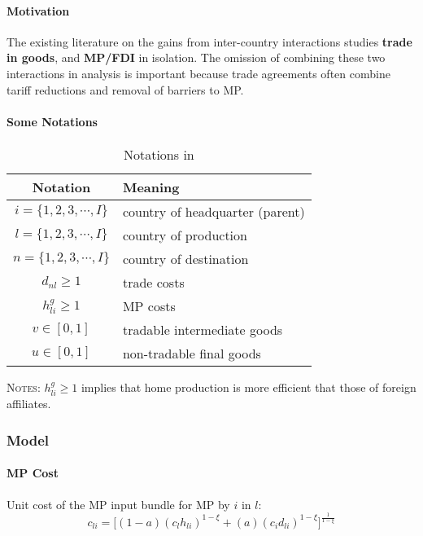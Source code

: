 \paragraph{Motivation}
The existing literature on the gains from inter-country interactions studies 
\textbf{trade in goods}, and \textbf{MP/FDI} in isolation.
The omission of combining these two interactions in analysis is important because 
trade agreements often combine tariff reductions and removal of barriers to MP.

\paragraph{Some Notations}
\begin{table}[h]
    \caption{Notations in \citep{Ramondo:2013}}
        \centering
        \begin{tabular}{c l} \toprule
            Notation & Meaning \\ \hline
            $i = \{1, 2, 3, \cdots, I\}$ & country of headquarter (parent) \\
            $l = \{1, 2, 3, \cdots, I\}$ & country of production \\
            $n = \{1, 2, 3, \cdots, I\}$ & country of destination \\
            $d_{nl} \geq 1$ & trade costs \\
            $h_{li}^g \geq 1$ & MP costs \\
            $v \in [0, 1]$ & tradable intermediate goods \\
            $u \in [0, 1]$ & non-tradable final goods \\ 
            \bottomrule
        \end{tabular}
        \begin{minipage}{0.6\textwidth}{\footnotesize
            \textsc{Notes}: $h_{li}^g \geq 1$ implies that home production is more efficient that those of foreign affiliates.}
        \end{minipage}
\end{table}


\subsubsection{Model}
\paragraph{MP Cost}
Unit cost of the MP input bundle for MP by $i$ in $l$:
\begin{equation}
 c_{li} = \bigg[ (1-a) (c_l h_{li})^{1 - \xi} + (a) (c_i d_{li})^{1 - \xi}
    \bigg]^{\frac{1}{1-\xi}}
\end{equation}

